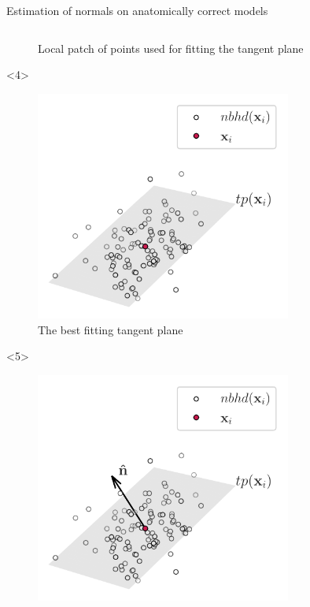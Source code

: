 \documentclass[xcolor=dvipsnames,10pt]{beamer}
\begin{document}
\begin{frame}{Estimation of normals on anatomically correct models}
\begin{columns}[c]
\begin{column}{0.5\textwidth}
\begin{onlyenv}
\begin{center}
\begin{figure}
                    \caption{Local patch of points used for fitting the tangent plane}
                \end{figure}
                \end{center}
            \end{onlyenv}
            \begin{onlyenv}<4>
                \begin{center}
                \begin{figure}
                    \includegraphics[width=0.75\textwidth]{artwork/orthogonal_set_2.pdf}
                    \caption{The best fitting tangent plane}
                \end{figure}
                \end{center}
            \end{onlyenv}
            \begin{onlyenv}<5>
                \begin{center}
                \begin{figure}
                    \includegraphics[width=0.75\textwidth]{artwork/orthogonal_set_3.pdf}

\end{figure}
\end{center}
\end{onlyenv}
\end{column}
\end{columns}
\end{frame}
\end{document}
